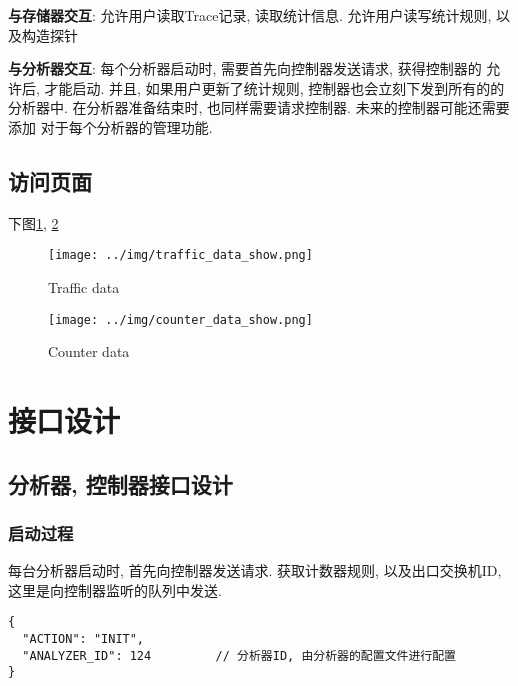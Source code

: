 \textbf{与存储器交互}: 允许用户读取Trace记录, 读取统计信息. 允许用户读写统计规则,
以及构造探针

\textbf{与分析器交互}: 每个分析器启动时, 需要首先向控制器发送请求, 获得控制器的
允许后, 才能启动. 并且, 如果用户更新了统计规则, 控制器也会立刻下发到所有的的
分析器中. 在分析器准备结束时, 也同样需要请求控制器. 未来的控制器可能还需要添加
对于每个分析器的管理功能.


\section{访问页面}

下图\ref{fig:traffic_data_show}, \ref{fig:counter_data_show}



\begin{figure}[htbp!]
  \centering
  \texttt{[image: ../img/traffic\_data\_show.png]}
  \caption{Traffic data}
  \label{fig:traffic_data_show}
\end{figure}

\begin{figure}[htbp!]
  \centering
  \texttt{[image: ../img/counter\_data\_show.png]}
  \caption{Counter data}
  \label{fig:counter_data_show}
\end{figure}


\chapter{接口设计}\label{chap:接口设计}

\section{分析器, 控制器接口设计}
\label{sec:分析器, 控制器接口设计}

\subsection{启动过程}

每台分析器启动时, 首先向控制器发送请求. 获取计数器规则, 以及出口交换机ID,
这里是向控制器监听的队列中发送.

\begin{lstlisting}
{
  "ACTION": "INIT",
  "ANALYZER_ID": 124         // 分析器ID, 由分析器的配置文件进行配置
}
\end{lstlisting}

